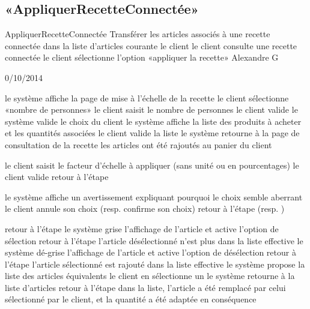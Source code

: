\subsection{«AppliquerRecetteConnectée»}

\startCU
\nom AppliquerRecetteConnectée
\but Transférer les articles associés à une recette connectée dans la liste d'articles courante
\acteur le client
\precondition le client consulte une recette connectée 
\declenchement le client sélectionne l'option «appliquer la recette»
\auteur Alexandre G
\date 30/10/2014

\nominal %
\startnominal
{} le système affiche la page de mise à l'échelle de la recette
 le client sélectionne «nombre de personnes» 
\etape le client saisit le nombre de personnes
\etape le client valide
 le système valide le choix du client
 le système affiche la liste des produits à acheter et les quantités associées
 le client valide la liste
\etape le système retourne à la page de consultation de la recette
\stopnominal
\postcondition les articles ont été rajoutés au panier du client

\alternatifs 
{} 
  \etape le client saisit le facteur d'échelle à appliquer (sans unité ou en pourcentages)
  \etape le client valide
  \etape retour à l'étape 
\stopcondition
\stopalternatif

  \etape le système affiche un avertissement expliquant pourquoi le choix semble aberrant
  \etape le client annule son choix (resp. confirme son choix)
  \etape retour à l'étape  (resp. )
\stopcondition
\stopalternatif

  \etape retour à l'étape 
\stopcondition
{} 
  \etape le système grise l'affichage de l'article et active l'option de sélection
  \etape retour à l'étape 
\stopcondition
\postcondition l'article désélectionné n'est plus dans la liste effective
  \etape le système dé-grise l'affichage de l'article et active l'option de désélection
  \etape retour à l'étape 
\stopcondition
\postcondition l'article sélectionné est rajouté dans la liste effective
  \etape le système propose la liste des articles équivalents
  \etape le client en sélectionne un
  \etape le système retourne à la liste d'articles
  \etape retour à l'étape 
\stopcondition
\postcondition dans la liste, l'article a été remplacé par celui sélectionné par le client, et la quantité a été adaptée en conséquence
\stopalternatif

